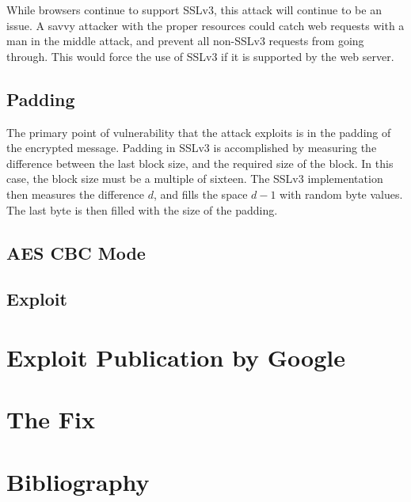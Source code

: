 \documentclass[10pt]{article}
\begin{document}
While browsers continue to support SSLv3, this attack will continue to be an
issue. A savvy attacker with the proper resources could catch web requests with
a man in the middle attack, and prevent all non-SSLv3 requests from going through.
This would force the use of SSLv3 if it is supported by the web server. 

\subsection*{Padding}
The primary point of vulnerability that the attack exploits is in the padding
of the encrypted message. Padding in SSLv3 is accomplished by measuring the 
difference between the last block size, and the required size of the block. In
this case, the block size must be a multiple of sixteen. The SSLv3 implementation
then measures the difference $d$, and fills the space $d-1$ with random byte
values. The last byte is then filled with the size of the padding. 
\subsection*{AES CBC Mode}
\subsection*{Exploit}

\section*{Exploit Publication by Google}
\section*{The Fix}

\section*{Bibliography}


\end{document}
